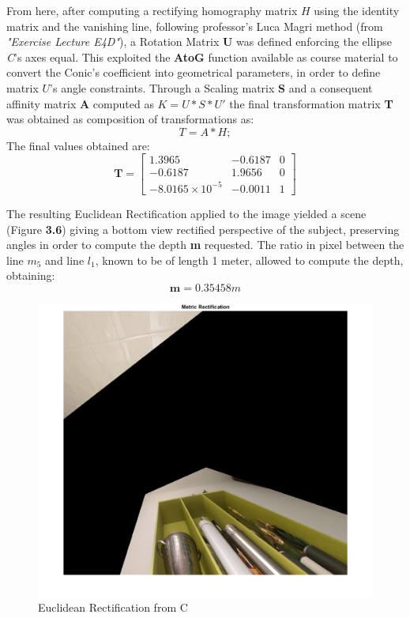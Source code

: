 \documentclass{Configuration_Files/PoliMi3i_thesis}
\begin{document}
From here, after computing a rectifying homography matrix \( H \) using the identity matrix and the vanishing line, following professor's Luca Magri method (from \textit{"Exercise Lecture E4D"}), a Rotation Matrix \textbf{U} was defined enforcing the ellipse \textit{C}'s axes equal. This exploited the \textbf{AtoG} function available as course material to convert the Conic's coefficient into geometrical parameters, in order to define matrix $U$'s angle constraints. Through a Scaling matrix \textbf{S} and a consequent affinity matrix \textbf{A} computed as \(K = U * S * U'\) the final transformation matrix \textbf{T} was obtained as composition of transformations as:
\[
T = A * H;
\]
The final values obtained are:
\[
\mathbf{T} = \begin{bmatrix}
1.3965 & -0.6187 & 0 \\
-0.6187 & 1.9656 & 0 \\
-8.0165\times10^{-5} & -0.0011 & 1
\end{bmatrix}
\]

The resulting Euclidean Rectification applied to the image yielded a scene (Figure \textbf{3.6}) giving a bottom view rectified perspective of the subject, preserving angles in order to compute the depth \textbf{m} requested. The ratio in pixel between the line \( m_5 \) and line \( l_1 \), known to be of length 1 meter, allowed to compute the depth, obtaining: 
\[
\mathbf{m} = 0.35458 m
\]

\begin{figure}[H]
    \centering
    \includegraphics[width=0.8\linewidth]{Project Template/Images/metricrect.png}
    \caption{Euclidean Rectification from C}
    \label{fig:enter-label}
\end{figure}
\end{document}
